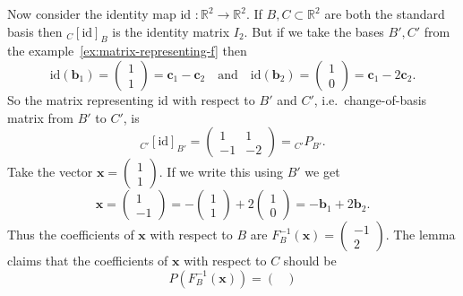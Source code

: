 \documentclass[12pt]{report}
\theoremstyle{definition}
\begin{document}
\begin{ex}
    Now consider the identity map id $:
    \mathbb{R}^{2}\rightarrow\mathbb{R}^{2}$.
    If $B,C\subset \mathbb{R}^{2}$ are both the standard basis
    then ${}_C{[\text{id}]}_{B}$ is the identity matrix $I_2$.
    But if we take the bases $B', C'$ from the
    example~\ref{ex:matrix-representing-f} then \[
        \text{id}(\mathbf{b}_1) = \begin{pmatrix}
                1 \\
                1
        \end{pmatrix} = \mathbf{c}_1 - \mathbf{c}_2
        \quad\text{and}\quad
        \text{id}(\mathbf{b}_2) = \begin{pmatrix}
                1 \\
                0
        \end{pmatrix} = \mathbf{c}_1 - 2\mathbf{c}_2.
    \]
    So the matrix representing id with respect to $B'$ and $C'$,
    i.e.\ change-of-basis matrix from $B'$ to $C'$, is\[
        {}_{C'}{[\text{id}]}_{B'} = \begin{pmatrix}
            1 & 1 \\
            -1 & -2
        \end{pmatrix} = {}_{C'}P_{B'}.
    \]
    Take the vector $\mathbf{x} = \begin{pmatrix}
            1 \\
            1
    \end{pmatrix} $. If we write this using $B'$ we get\[
        \mathbf{x} = \begin{pmatrix}
                1 \\
                -1
        \end{pmatrix} = -\begin{pmatrix}
                1 \\
                1
        \end{pmatrix} + 2\begin{pmatrix}
                1 \\
                0
        \end{pmatrix} = -\mathbf{b}_1 + 2\mathbf{b}_2.
    \]
    Thus the coefficients of $\mathbf{x}$ with respect to $B$ are
    $F_B^{-1}(\mathbf{x}) = \begin{pmatrix}
            -1 \\
            2
    \end{pmatrix} $. The lemma claims that the coefficients of $\mathbf{x}$
    with respect to $C$ should be\[
        P(F_B^{-1}(\mathbf{x})) = \begin{pmatrix}

\end{pmatrix}\]
\end{ex}
\end{document}
